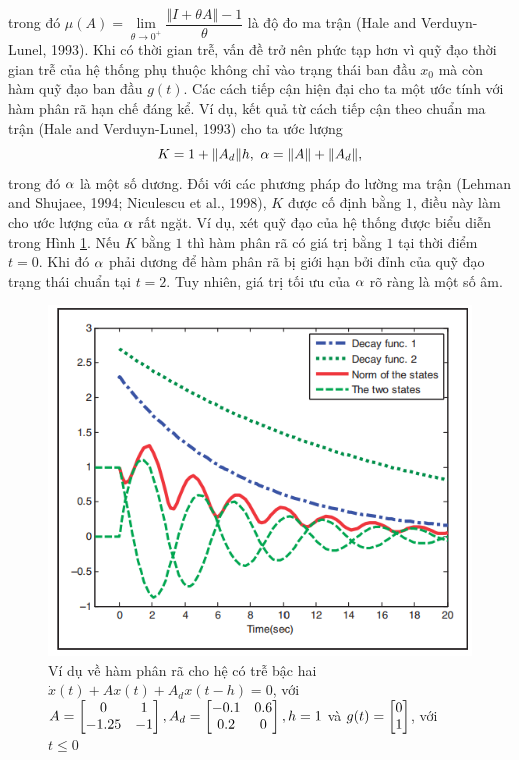 trong đó $\mu (A) = \lim\limits_{\theta \to 0^+}\dfrac{\Vert I + \theta A\Vert -1}{\theta}$ là độ đo ma trận (Hale and Verduyn-Lunel, 1993).
%
Khi có thời gian trễ, vấn đề trở nên phức tạp hơn vì quỹ đạo thời gian trễ của hệ thống phụ thuộc không chỉ vào trạng thái ban đầu $x_0$ mà còn hàm quỹ đạo ban đầu  $g(t)$. Các cách tiếp cận hiện đại cho ta một ước tính với hàm phân rã hạn chế đáng kể. Ví dụ, kết quả từ cách tiếp cận theo chuẩn ma trận (Hale and Verduyn-Lunel, 1993) cho ta ước lượng
%
\begin{equation}\label{4}
	K = 1 + \Vert A_d \Vert h, \ \alpha = \Vert A \Vert + \Vert A_d \Vert , 
\end{equation}
%
trong đó $\alpha$ là một số dương. Đối với các phương pháp đo lường ma trận (Lehman and Shujaee, 1994; Niculescu et al., 1998), $K$ được cố định bằng $1$, điều này làm cho ước lượng của $\alpha$ rất ngặt. Ví dụ, xét quỹ đạo của hệ thống được biểu diễn trong Hình \ref{fig:hinh-11}. Nếu $K$ bằng $1$ thì hàm phân rã có giá trị bằng $1$ tại thời điểm $t=0$. Khi đó $\alpha$ phải dương để hàm phân rã bị giới hạn bởi đỉnh của quỹ đạo trạng thái chuẩn tại $t = 2$. Tuy nhiên, giá trị tối ưu của $\alpha$ rõ ràng là một số âm.
\begin{figure}[h!]
	\centering
	\includegraphics[scale= 0.7]{"./Hinh/Hinh11"}
	\caption[Ví dụ về hàm phân rã cho hệ có trễ bậc hai $\dot{x}(t) + Ax(t) + A_dx(t-h)= 0$, với $A = \m{0& 1\\ -1.25& -1}, A_d= \m{-0.1&0.6 \\ 0.2&0}, h = 1$ và $g(t)= \m{0\\1}$, với $t \le 0$]{Ví dụ về hàm phân rã cho hệ có trễ bậc hai $\dot{x}(t) + Ax(t) + A_dx(t-h)= 0$, với $A = \m{0& 1\\ -1.25& -1}, A_d= \m{-0.1&0.6 \\ 0.2&0}, h = 1$ và $g(t)= \m{0\\1}$, với $t \le 0$}
	\label{fig:hinh-11}
\end{figure}
